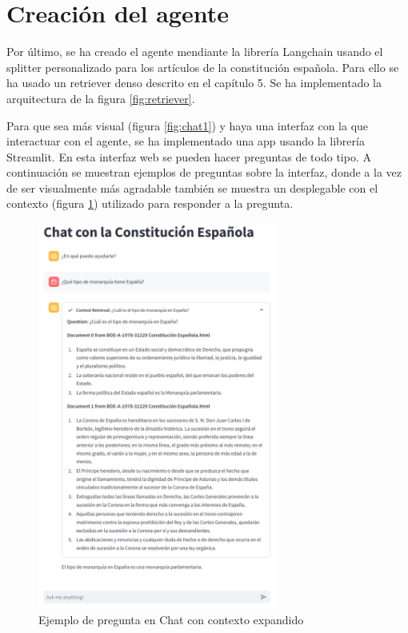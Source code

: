 \section{Creación del agente}

Por último, se ha creado el agente mendiante la librería Langchain usando el splitter personalizado para los artículos de la constitución española. Para ello se ha usado un retriever denso descrito en el capítulo 5. Se ha implementado la arquitectura de la figura \ref{fig:retriever}.

Para que sea más visual (figura \ref{fig:chat1}) y haya una interfaz con la que interactuar con el agente, se ha implementado una app usando la librería Streamlit. En esta interfaz web se pueden hacer preguntas de todo tipo. A continuación se muestran ejemplos de preguntas sobre la interfaz, donde a la vez de ser visualmente más agradable también se muestra un desplegable con el contexto (figura \ref{fig:chat2}) utilizado para responder a la pregunta.

\begin{figure}[h]
\centering
\includegraphics[width=0.7\textwidth]{figuras/capitulo6/chat2exp.png}
\caption{Ejemplo de pregunta en Chat con contexto expandido}\label{fig:chat2}
\end{figure}


